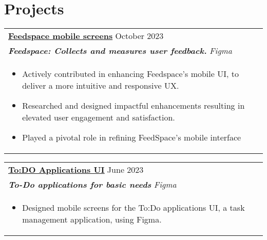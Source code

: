 \documentclass[a4paper,8pt]{article}
\begin{document}
\section{Projects}
\begin{tabularx}{\linewidth}{ @{}l r@{} }
\color[HTML]{1C033C} \textbf{\uline{Feedspace mobile screens}} \hfill \color[HTML]{371e77} October 2023  \\[4pt]
\color[HTML]{371e77}\textbf{\textit{Feedspace: Collects and measures user feedback.}} \hfill \color[HTML]{4B28A4} \textit{Figma} \\[5pt]
\begin{minipage}[t]{\linewidth}
    \begin{itemize}[nosep,after=\strut, leftmargin=2em, itemsep=2pt]
        \item Actively contributed in enhancing Feedspace's mobile UI, to deliver a more intuitive and responsive UX.
        \item Researched and designed impactful enhancements resulting in elevated user engagement and satisfaction.
        \item Played a pivotal role in refining FeedSpace's mobile interface
    \end{itemize}
    \end{minipage}
\end{tabularx}
\begin{tabularx}{\linewidth}{ @{}l r@{} }
\color[HTML]{1C033C} \textbf{\uline{\href{https://github.com/githamdaan25/Memory-Retention-Tool}{To:DO Applications UI}}} \hfill \color[HTML]{371e77} June 2023 \\[4pt]
\color[HTML]{371e77}\textbf{\textit{To-Do applications for basic needs }} \hfill \color[HTML]{4B28A4} \textit{Figma} \\[5pt]
\begin{minipage}[t]{\linewidth}
    \begin{itemize}[nosep,after=\strut, leftmargin=2em, itemsep=2pt]
        \item Designed mobile screens for the To:Do applications UI, a task management application, using Figma.
    \end{itemize}
    \end{minipage}
\end{tabularx}
\end{document}
